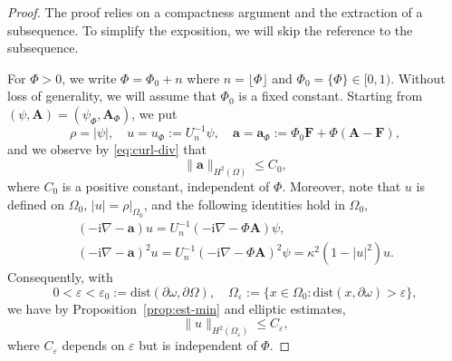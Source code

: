 \documentclass[10pt,a4paper]{amsart}
\newcommand{\Ab}{\mathbf A}
\newcommand{\Fb}{\mathbf F}
\newcommand{\ab}{\mathbf a}
\newcommand{\ii}{\mathrm i}
\begin{document}
\begin{proof}
The proof relies on a compactness argument and the extraction of a subsequence. To simplify the exposition, we will skip the reference to the subsequence.

For $\Phi>0$, we write $\Phi=\Phi_0+n$ where $n=\lfloor \Phi\rfloor$ and $\Phi_0=\{\Phi\}\in [0,1)$. Without loss of generality, we will assume that $\Phi_0$ is a fixed constant. Starting from $(\psi,\Ab)=(\psi_\Phi,\Ab_\Phi)$, we put
\[ \rho=|\psi|,\quad u=u_\Phi:=U_n^{-1}\psi,\quad \ab=\ab_\Phi:=\Phi_0\Fb+\Phi(\Ab-\Fb), \]
and we observe by \eqref{eq:curl-div} that
\[ \|\ab\|_{H^2(\Omega)}\leq C_0,\]
where $C_0$ is a positive constant, independent of $\Phi$.  Moreover, note that $u$ is defined on $\Omega_0$,  $|u|=\rho|_{\Omega_0}$, and the  following identities hold in $\Omega_0$,
\[\begin{gathered}
(-\ii\nabla-\ab)u=U_n^{-1}(-\ii\nabla-\Phi\Ab)\psi,\\
(-\ii\nabla-\ab)^2u=U_n^{-1}(-\ii\nabla-\Phi\Ab)^2\psi=\kappa^2(1-|u|^2)u.
\end{gathered}\]
Consequently, with
\begin{equation}\label{eq:def-Om-ep}
0<\varepsilon<\varepsilon_0:=\mathrm{dist}(\partial\omega,\partial\Omega),\quad \Omega_\varepsilon:=\{x\in\Omega_0\colon \mathrm{dist}(x,\partial\omega)>\varepsilon\},
\end{equation} we have  by Proposition~\ref{prop:est-min} and elliptic estimates,
\[\|u\|_{H^2(\Omega_\varepsilon)}\leq C_\varepsilon, \]
where $C_\varepsilon$ depends on $\varepsilon$ but is independent of $\Phi$.



\end{proof}
\end{document}
